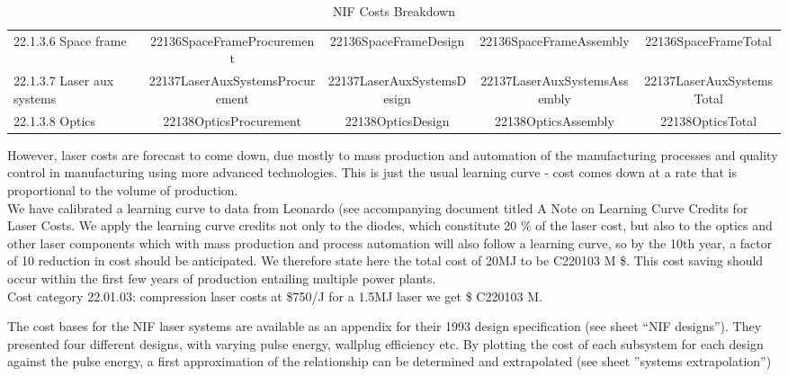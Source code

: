 \begin{table}[h!]
{\begin{tabular}{lcccc}
\hspace{5mm}22.1.3.6 Space frame & 22136SpaceFrameProcurement & 22136SpaceFrameDesign & 22136SpaceFrameAssembly & 22136SpaceFrameTotal \\
\hspace{5mm}22.1.3.7 Laser aux systems & 22137LaserAuxSystemsProcurement & 22137LaserAuxSystemsDesign & 22137LaserAuxSystemsAssembly & 22137LaserAuxSystemsTotal \\
\hspace{5mm}22.1.3.8 Optics & 22138OpticsProcurement & 22138OpticsDesign & 22138OpticsAssembly & 22138OpticsTotal \\
\hline
\end{tabular}}
\caption{NIF Costs Breakdown}
\label{tab:nif_costs}
\end{table}

 However, laser costs are forecast to come down, due mostly to mass production and automation of the manufacturing processes and  
 quality control in manufacturing using more advanced technologies.   
 This is just the usual learning curve - cost comes down at a rate that is proportional to the volume of production.  \\ 

 We have calibrated a learning curve to data from Leonardo (see accompanying document titled A Note on Learning Curve Credits for Laser Costs. 
 We apply the learning curve credits not only to the diodes, which constitute 20 \% of the laser cost, but also to the  
 optics and other laser components which with mass production and process automation will also follow a learning curve, so  
 by the 10th year, a factor of 10 reduction in cost should be anticipated.  We therefore state here the total cost of 20MJ  
 to be C220103 M \$.  This cost saving should occur within the first few years of production entailing multiple power plants. \\

Cost category 22.01.03: compression laser costs at  \$750/J for a 1.5MJ laser we get \$ C220103 M.


The cost bases for the NIF laser systems are available 
as an appendix for their 1993 design specification (see sheet ``NIF designs''). They presented four different designs, with varying pulse energy, wallplug efficiency etc. By plotting the cost of each subsystem for each design against the pulse energy, a first approximation of the relationship  can be determined and extrapolated (see sheet ''systems extrapolation'')

